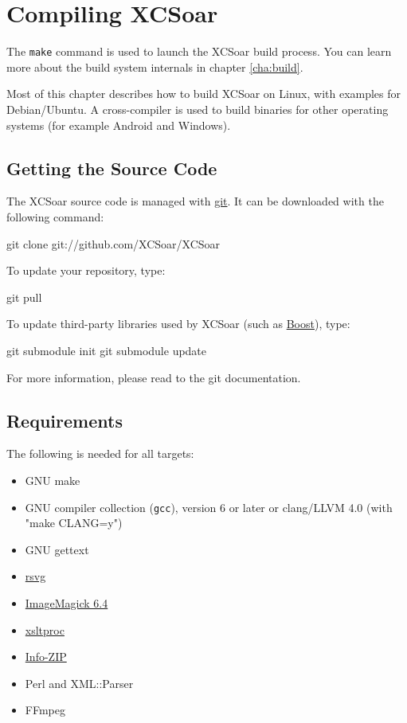 \chapter{Compiling XCSoar}\label{cha:compiling}

The \texttt{make} command is used to launch the XCSoar build process.
You can learn more about the build system internals in chapter
\ref{cha:build}.

Most of this chapter describes how to build XCSoar on Linux, with
examples for Debian/Ubuntu.  A cross-compiler is used to build
binaries for other operating systems (for example Android and
Windows).

\section{Getting the Source Code}

The XCSoar source code is managed with
\href{http://git-scm.com/}{git}.  It can be downloaded with the
following command:

\begin{verbatim*}
git clone git://github.com/XCSoar/XCSoar
\end{verbatim*}

To update your repository, type:

\begin{verbatim*}
git pull
\end{verbatim*}

To update third-party libraries used by XCSoar (such as
\href{http://www.boost.org/}{Boost}), type:

\begin{verbatim*}
git submodule init
git submodule update
\end{verbatim*}

For more information, please read to the git documentation.

\section{Requirements}

The following is needed for all targets:

\begin{itemize}
\item GNU make
\item GNU compiler collection (\texttt{gcc}), version 6 or later
  or clang/LLVM 4.0 (with "make CLANG=y")
\item GNU gettext
\item \href{http://librsvg.sourceforge.net/)}{rsvg}
\item \href{http://www.imagemagick.org/}{ImageMagick 6.4}
\item \href{http://xmlsoft.org/XSLT/xsltproc2.html}{xsltproc}
\item \href{http://www.info-zip.org/}{Info-ZIP}
\item Perl and XML::Parser
\item FFmpeg
\end{itemize}

